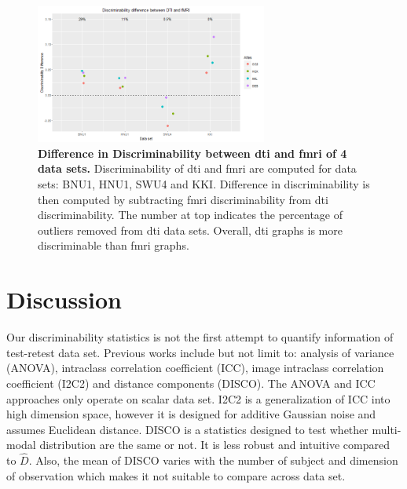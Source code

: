 \documentclass{article}
\begin{document}
\begin{figure}[t!]
	\includegraphics[width=3.0in]{../Figs/dti_mri_differ.png}
	\caption{{\bf Difference in Discriminability between dti and fmri of 4 data sets.} Discriminability of dti and fmri are computed for data sets: BNU1, HNU1, SWU4 and KKI. Difference in discriminability is then computed by subtracting fmri discriminability from dti discriminability. The number at top indicates the percentage of outliers removed from dti data sets. Overall, dti graphs is more discriminable than fmri graphs. }
	\label{fig:9}
\end{figure}








\section{Discussion}


Our discriminability statistics is not the first attempt to quantify information of test-retest data set. Previous works include but not limit to: analysis of variance (ANOVA), intraclass correlation coefficient (ICC), image intraclass correlation coefficient (I2C2) and distance components (DISCO). The ANOVA and ICC approaches only operate on scalar data set. I2C2 is a generalization of ICC into high dimension space, however it is designed for additive Gaussian noise and assumes Euclidean distance. DISCO is a statistics designed to test whether multi-modal distribution are the same or not. It is less robust and intuitive compared to $\hat{D}$. Also, the mean of DISCO varies with the number of subject and dimension of observation which makes it not suitable to compare across data set.




% 
% 
% 
% 
% 
% 
% 
% 



\appendix






\newpage
\small{


}
\end{document}

